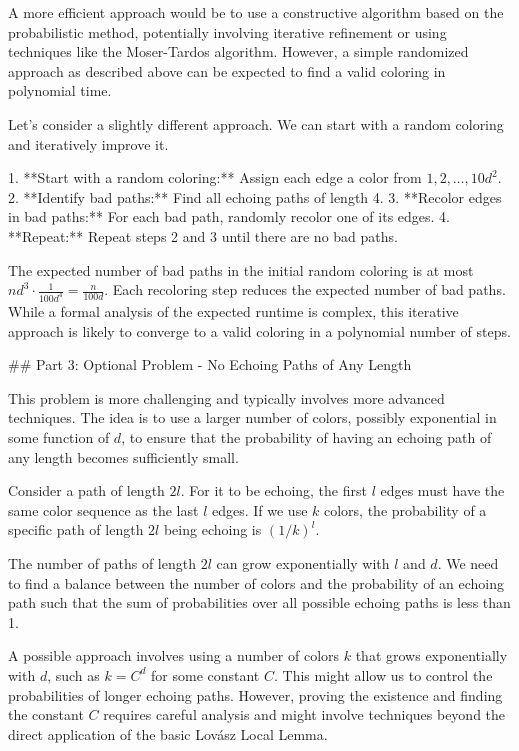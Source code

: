 \begin{enumerate}
\begin{shaded}
A more efficient approach would be to use a constructive algorithm based on the probabilistic method, potentially involving iterative refinement or using techniques like the Moser-Tardos algorithm. However, a simple randomized approach as described above can be expected to find a valid coloring in polynomial time.

Let's consider a slightly different approach. We can start with a random coloring and iteratively improve it.

1. **Start with a random coloring:** Assign each edge a color from $1, 2, \dots, 10d^2$.
2. **Identify bad paths:** Find all echoing paths of length 4.
3. **Recolor edges in bad paths:** For each bad path, randomly recolor one of its edges.
4. **Repeat:** Repeat steps 2 and 3 until there are no bad paths.

The expected number of bad paths in the initial random coloring is at most $n d^3 \cdot \frac{1}{100d^4} = \frac{n}{100d}$. Each recoloring step reduces the expected number of bad paths. While a formal analysis of the expected runtime is complex, this iterative approach is likely to converge to a valid coloring in a polynomial number of steps.

## Part 3: Optional Problem - No Echoing Paths of Any Length

This problem is more challenging and typically involves more advanced techniques. The idea is to use a larger number of colors, possibly exponential in some function of $d$, to ensure that the probability of having an echoing path of any length becomes sufficiently small.

Consider a path of length $2l$. For it to be echoing, the first $l$ edges must have the same color sequence as the last $l$ edges. If we use $k$ colors, the probability of a specific path of length $2l$ being echoing is $(1/k)^l$.

The number of paths of length $2l$ can grow exponentially with $l$ and $d$. We need to find a balance between the number of colors and the probability of an echoing path such that the sum of probabilities over all possible echoing paths is less than 1.

A possible approach involves using a number of colors $k$ that grows exponentially with $d$, such as $k = C^d$ for some constant $C$. This might allow us to control the probabilities of longer echoing paths. However, proving the existence and finding the constant $C$ requires careful analysis and might involve techniques beyond the direct application of the basic Lovász Local Lemma.


\end{shaded}
\end{enumerate}
